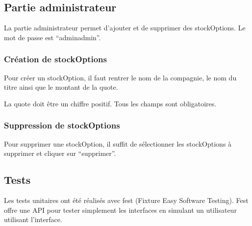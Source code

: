 \subsection{Partie administrateur}
La partie administrateur permet d'ajouter et de supprimer des stockOptions. Le mot de passe est ``adminadmin''.
\subsubsection{Création de stockOptions}
Pour créer un stockOption, il faut rentrer le nom de la compagnie, le nom du titre ainsi que le montant de la quote.

La quote doit être un chiffre positif. Tous les champs sont obligatoires.
\subsubsection{Suppression de stockOptions}
Pour supprimer une stockOption, il suffit de sélectionner les stockOptions à supprimer et cliquer sur ``supprimer''.
\subsection{Tests}
Les tests unitaires ont été réalisés avec fest (Fixture Easy Software Testing). Fest offre une API pour tester simplement les interfaces en simulant un utilisateur utilisant l'interface.
